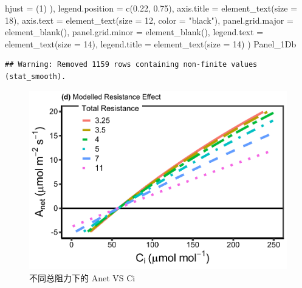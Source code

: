 \documentclass[
]{krantz}
\makeatletter
\newenvironment{Shaded}{\begin{snugshade}}{\end{snugshade}}
\newcommand{\AttributeTok}[1]{\textcolor[rgb]{0.77,0.63,0.00}{#1}}
\newcommand{\DecValTok}[1]{\textcolor[rgb]{0.00,0.00,0.81}{#1}}
\newcommand{\FloatTok}[1]{\textcolor[rgb]{0.00,0.00,0.81}{#1}}
\newcommand{\FunctionTok}[1]{\textcolor[rgb]{0.00,0.00,0.00}{#1}}
\newcommand{\NormalTok}[1]{#1}
\newcommand{\StringTok}[1]{\textcolor[rgb]{0.31,0.60,0.02}{#1}}
\newenvironment{kframe}{%
\medskip{}
\setlength{\fboxsep}{.8em}
 \def\at@end@of@kframe{}%
 \ifinner\ifhmode%
  \def\at@end@of@kframe{\end{minipage}}%
  \begin{minipage}{\columnwidth}%
 \fi\fi%
 \def\FrameCommand##1{\hskip\@totalleftmargin \hskip-\fboxsep
 \colorbox{shadecolor}{##1}\hskip-\fboxsep
     \hskip-\linewidth \hskip-\@totalleftmargin \hskip\columnwidth}%
 \MakeFramed {\advance\hsize-\width
   \@totalleftmargin\z@ \linewidth\hsize
   \@setminipage}}%
 {\par\unskip\endMakeFramed%
 \at@end@of@kframe}
\renewenvironment{Shaded}{\begin{kframe}}{\end{kframe}}
\makeatother
\begin{document}
\begin{Shaded}
\begin{Highlighting}[]
        \AttributeTok{hjust =}\NormalTok{ (}\DecValTok{1}\NormalTok{)}
\NormalTok{      ),}
    \AttributeTok{legend.position =} \FunctionTok{c}\NormalTok{(}\FloatTok{0.22}\NormalTok{, }\FloatTok{0.75}\NormalTok{),}
    \AttributeTok{axis.title =} \FunctionTok{element\_text}\NormalTok{(}\AttributeTok{size =} \DecValTok{18}\NormalTok{),}
    \AttributeTok{axis.text =} \FunctionTok{element\_text}\NormalTok{(}\AttributeTok{size =} \DecValTok{12}\NormalTok{, }\AttributeTok{color =} \StringTok{"black"}\NormalTok{),}
    \AttributeTok{panel.grid.major =} \FunctionTok{element\_blank}\NormalTok{(),}
    \AttributeTok{panel.grid.minor =} \FunctionTok{element\_blank}\NormalTok{(),}
    \AttributeTok{legend.text =} \FunctionTok{element\_text}\NormalTok{(}\AttributeTok{size =} \DecValTok{14}\NormalTok{),}
    \AttributeTok{legend.title =} \FunctionTok{element\_text}\NormalTok{(}\AttributeTok{size =} \DecValTok{14}\NormalTok{)}
\NormalTok{  )}
\NormalTok{Panel\_1Db}
\end{Highlighting}
\end{Shaded}

\begin{verbatim}
## Warning: Removed 1159 rows containing non-finite values (stat_smooth).
\end{verbatim}

\begin{figure}
\centering
\includegraphics{bookdown_files/figure-latex/resistplot-1.pdf}
\caption{\label{fig:resistplot}不同总阻力下的 Anet VS Ci}
\end{figure}
\end{document}
